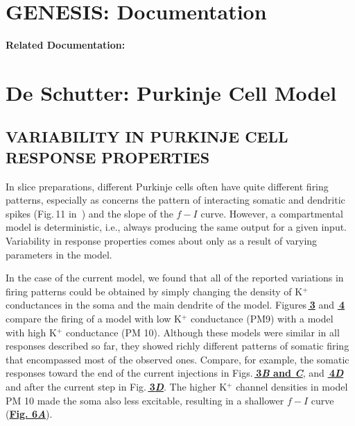 \documentclass[12pt]{article}
\begin{document}
\section*{GENESIS: Documentation}

{\bf Related Documentation:}

\section*{De Schutter: Purkinje Cell Model}

\subsection*{VARIABILITY IN PURKINJE CELL RESPONSE PROPERTIES}

In slice preparations, different Purkinje cells often have quite
different firing patterns, especially as concerns the pattern
of interacting somatic and dendritic spikes (Fig.\,11 in \,\cite{R:1980ly}) 
and the slope of the $f-I$ curve.
However, a compartmental model is deterministic, i.e., always
producing the same output for a given input. Variability
in response properties comes about only as a result of
varying parameters in the model.

In the case of the current model, we found that all of the
reported variations in firing patterns could be obtained by
simply changing the density of K$^+$ conductances in the
soma and the main dendrite of the model. Figures\,\href{../pub-purkinje-deschutter1-fig-3/pub-purkinje-deschutter1-fig-3.tex}{\bf\,3} and \href{../pub-purkinje-deschutter1-fig-4/pub-purkinje-deschutter1-fig-4.tex}{\bf\,4}
compare the firing of a model with low K$^+$ conductance
(PM9) with a model with high K$^+$ conductance (PM 10).
Although these models were similar in all responses described
so far, they showed richly different patterns of somatic firing that encompassed most of the observed ones.
Compare, for example, the somatic responses toward the
end of the current injections in Figs.\,\href{../pub-purkinje-deschutter1-fig-3/pub-purkinje-deschutter1-fig-3.tex}{\bf\,3{\it B} and {\it C}}, and \href{../pub-purkinje-deschutter1-fig-4/pub-purkinje-deschutter1-fig-4.tex}{\bf\,4{\it D}}
and after the current step in Fig.\,\href{../pub-purkinje-deschutter1-fig-3/pub-purkinje-deschutter1-fig-3.tex}{\bf\,3{\it D}}. The higher K$^+$ channel
densities in model PM 10 made the soma also less excitable,
resulting in a shallower $f-I$ curve (\href{../pub-purkinje-deschutter1-fig-6/pub-purkinje-deschutter1-fig-6.tex}{\bf Fig. 6{\it A}}).
\end{document}
